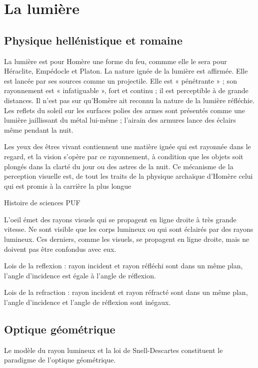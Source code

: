 
\section{La lumière}

\subsection{Physique hellénistique et romaine}

\vspace{0.24cm}
{\footnotesize
La lumière est pour Homère une forme du feu, commme elle le sera pour Héraclite, Empédocle et Platon. La nature ignée de la lumière est affirmée. Elle est lancée par ses sources comme un projectile. Elle est « pénétrante » ; son rayonnement est « infatiguable », fort et continu ; il est perceptible à de grande distances. Il n'est pas sur qu'Homère ait reconnu la nature de la lumière réfléchie. Les reflets du soleil sur les surfaces polies des armes sont présentés comme une lumière jaillissant du métal lui-même ; l'airain des armures lance des éclairs même pendant la nuit.

Les yeux des êtres vivant contiennent une matière ignée qui est rayonnée dans le regard, et la vision s'opère par ce rayonnement, à condition que les objets soit plongés dans la clarté du jour ou des astres de la nuit. Ce mécanisme de la perception visuelle est, de tout les traits de la physique archaïque d'Homère celui qui est promis à la carrière la plus longue

\begin{flushright}
Histoire de sciences PUF
\end{flushright}
 }
\vspace{0.31cm}

L'oeil émet des rayons visuels qui se propagent en ligne droite à très grande vitesse. Ne sont visible que les corps lumineux ou qui sont éclairés par des rayons lumineux. Ces derniers, comme les visuels, se propagent en ligne droite, mais ne doivent pas être confondus avec eux.

Lois de la reflexion : rayon incident et rayon réfléchi sont dans un même plan, l'angle d'incidence est égale à l'angle de réflexion.

Lois de la refraction : rayon incident et rayon réfracté sont dans un même plan, l'angle d'incidence et l'angle de réflexion sont inégaux. 

\subsection{Optique géométrique}
Le modèle du rayon lumineux et la loi de Snell-Descartes constituent le paradigme de l'optique géométrique.

